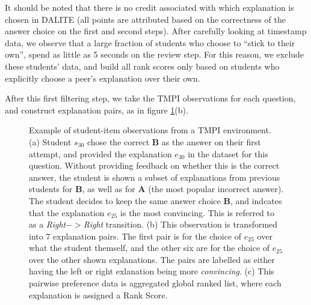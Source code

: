 \documentclass[notitlepage,12pt]{jedm}
\begin{document}
It should be noted that there is no credit associated with which explanation is 
chosen in DALITE (all points are attributed based on the  correctness of the 
answer choice on the first and second steps).
After carefully looking at timestamp data, we observe that a large fraction of 
students who choose to ``stick to their own'', spend as little as 5 seconds on 
the review step.
For this reason, we exclude these students' data, and build all rank scores 
only based on students who explicitly choose a peer's explanation over their 
own.

After this first filtering step, we take the TMPI observations for each 
question, and construct explanation pairs, as in figure 
\ref{fig:make_pairs_a}(b).

\begin{figure}
	\centering
	\def\svgscale{0.40}
	
	\caption{
	Example of student-item observations from a TMPI environment. 
	(a) Student $s_{30}$ chose the correct \textbf{B} as the answer on 
	their first attempt, and provided the explanation $e_{30}$ in the 
	dataset 
	for this question. 
	Without providing feedback on whether this is the correct answer, the 
	student is shown a subset of explanations from previous students for 
	\textbf{B}, as well as for \textbf{A} (the most popular incorrect 
	answer). 
	The student decides to keep the same answer choice \textbf{B}, and 
	indcates that the explanation $e_{25}$ is the most convincing.
	This is referred to as a \textit{Right}$->$\textit{Right} transition.
	(b) This observation is transformed into 7 explanation pairs. The first 
	pair is for the choice of $e_{25}$ over what the student themself, 
	and the other six are for the choice of $e_{25}$ over the other shown 
	explanations. 
	The pairs are labelled as either having the left or right exlanation 
	being 
	more \textit{convincing}.
	(c) This pairwise preference data is aggregated global ranked list, 
	where 
	each explanation is assigned a Rank Score. 
}
\label{fig:make_pairs_a}
\end{figure}
\end{document}
